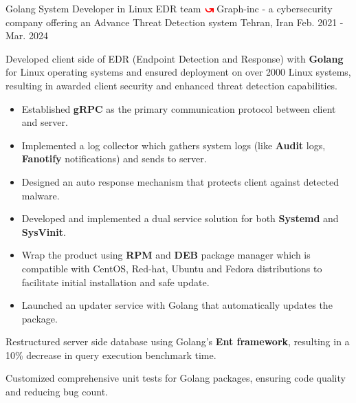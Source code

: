 \begin{cventries}
  \cventry
    {Golang System Developer in Linux EDR team} %
    {\includegraphics[width=0.027\textwidth]{images/graph-inc.png} Graph-inc - \textnormal{a cybersecurity company offering an Advance Threat Detection system}} %
    {Tehran, Iran} %
    {Feb. 2021 - Mar. 2024} %
    {
      \begin{cvitems} %
        \item Developed client side of EDR (Endpoint Detection and Response) with \textbf{Golang} for Linux operating systems and ensured deployment on over 2000 Linux systems, resulting in awarded client security and enhanced threat detection capabilities.
        \begin{itemize}
            \item Established \textbf{gRPC} as the primary communication protocol between client and server.
            \item Implemented a log collector which gathers system logs (like \textbf{Audit} logs, \textbf{Fanotify} notifications) and sends to server. 
            \item Designed an auto response mechanism that protects client against detected malware.
            \item Developed and implemented a dual service solution for both \textbf{Systemd} and \textbf{SysVinit}.
            \item Wrap the product using \textbf{RPM} and \textbf{DEB} package manager which is compatible with CentOS, Red-hat, Ubuntu and Fedora distributions to facilitate initial installation and safe update.
            \item Launched an updater service with Golang that automatically updates the package.
        \end{itemize}
        \item Restructured server side database using Golang's \textbf{Ent framework}, resulting in a 10\% decrease in query execution benchmark time.
        \item Customized comprehensive unit tests for Golang packages, ensuring code quality and reducing bug count.
      \end{cvitems}
    }
    \vspace{0.5cm}


\end{cventries}
